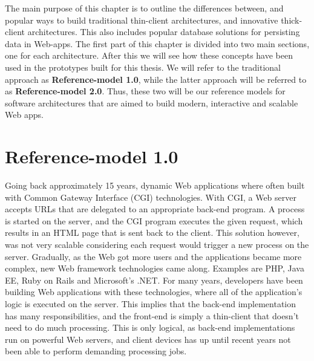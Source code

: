 The main purpose of this chapter is to outline the differences between, and popular ways to build traditional thin-client architectures, and innovative thick-client architectures. This also includes popular database solutions for persisting data in Web-apps. The first part of this chapter is divided into two main sections, one for each architecture. After this we will see how these concepts have been used in the prototypes built for this thesis. We will refer to the traditional approach as \textbf{Reference-model 1.0}, while the latter approach will be referred to as \textbf{Reference-model 2.0}. Thus, these two will be our reference models for software architectures that are aimed to build modern, interactive and scalable Web apps. 

\section{Reference-model 1.0}
Going back approximately 15 years, dynamic Web applications where often built with Common Gateway Interface (CGI) technologies\cite{cgi}. With CGI, a Web server accepts URLs that are delegated to an appropriate back-end program. A process is started on the server, and the CGI program executes the given request, which results in an HTML page that is sent back to the client. This solution however, was not very scalable considering each request would trigger a new process on the server. Gradually, as the Web got more users and the applications became more complex, new Web framework technologies came along. Examples are PHP\cite{php}, Java EE\cite{j2eeglance}, Ruby on Rails\cite{rails} and Microsoft's .NET\cite{popFrameworks}. For many years, developers have been building Web applications with these technologies, where all of the application's logic is executed on the server. This implies that the back-end implementation has many responsibilities, and the front-end is simply a thin-client that doesn't need to do much processing. This is only logical, as back-end implementations run on powerful Web servers, and client devices has up until recent years not been able to perform demanding processing jobs.
	
